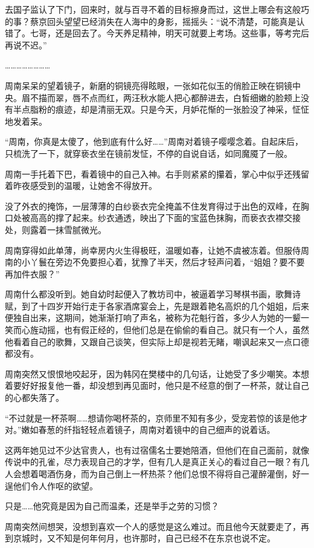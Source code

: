 去国子监认了下门，回来时，就与百寻不着的目标擦身而过，这世上哪会有这般巧的事？蔡京回头望望已经消失在人海中的身影，摇摇头：“说不清楚，可能真是认错了。七哥，还是回去了。今天养足精神，明天可就要上考场。这些事，等考完后再说不迟。”

……………………

周南呆呆的望着镜子，新磨的铜镜亮得眩眼，一张如花似玉的俏脸正映在铜镜中央。眉不描而翠，唇不点而红，两汪秋水能人把心都醉进去，白皙细嫩的脸颊上没有半点脂粉的痕迹，却是清丽无双。只是今天，月妒花惭的一张脸没了神采，怔怔地发着呆。

“周南，你真是太傻了，他到底有什么好……”周南对着镜子嘤嘤念着。自起床后，只梳洗了一下，就穿亵衣坐在镜前发怔，不停的自说自话，如同魔魇了一般。

周南一手托着下巴，看着镜中的自己入神。右手则紧紧的攥着，掌心中似乎还残留着昨夜感受到的温暖，让她舍不得放开。

没了外衣的掩饰，一层薄薄的白纱亵衣完全掩盖不住发育得过于出色的双峰，在胸口处被高高的撑了起来。纱衣通透，映出了下面的宝蓝色抹胸，而亵衣衣襟交接处，则露着一抹雪腻微光。

周南穿得如此单薄，尚幸房内火生得极旺，温暖如春，让她不虞被冻着。但服侍周南的小丫鬟在旁边不免要担心着，犹豫了半天，然后才轻声问着，“姐姐？要不要再加件衣服？”

周南什么都没听到。她自幼时起便入了教坊司中，被逼着学习琴棋书画，歌舞诗赋，到了十四岁开始行走于各家酒席宴会上，先是跟着艳名高炽的几个姐姐，后来便独自出来，这期间，她渐渐打响了声名，被称为花魁行首，多少人为她的一颦一笑而心旌动摇，也有假正经的，但他们总是在偷偷的看自己。就只有一个人，虽然他看着自己的歌舞，又跟自己谈笑，但实际上却是视若无睹，嘲讽起来又一点口德都没有。

周南突然又恨恨地咬起牙，因为韩冈在樊楼中的几句话，让她受了多少嘲笑。本想着要好好报复他一番，却没想到再见面时，他只是不经意的倒了一杯茶，就让自己的心都失落了。

“不过就是一杯茶啊……想请你喝杯茶的，京师里不知有多少，受宠若惊的该是他才对。”嫩如春葱的纤指轻轻点着镜子，周南对着镜中的自己细声的说着话。

这两年她见过不少达官贵人，也有过宿儒名士要她陪酒，但他们在自己面前，就像传说中的孔雀，尽力表现自己的才学，但有几人是真正关心的看过自己一眼？有几人会想着喝酒伤身，而为自己倒上一杯热茶？他们总恨不得将自己灌醉灌倒，好一逞他们令人作呕的欲望。

只是……他究竟是因为自己而温柔，还是举手之劳的习惯？

周南突然间想哭，没想到喜欢一个人的感觉是这么难过。而且他今天就要走了，再到京城时，又不知是何年何月，也许那时，自己已经不在东京也说不定。

